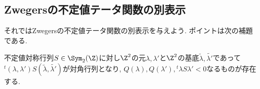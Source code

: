 \documentclass[11pt,b5paper,oneside,lualatex]{ltjsarticle} %
\numberwithin{equation}{section} %
\begin{document}

\subsection{Zwegersの不定値テータ関数の別表示} \label{subsec:Zwegers_theta_rep}


それではZwegersの不定値テータ関数の別表示を与えよう. 
ポイントは次の補題である. 

\begin{lem} \label{lembasis_indef}
	不定値対称行列$ S \in \Sym_2(\Z) $に対し$ \Z^2 $の元$ \lambda, \lambda' $と$ \Z^2 $の基底$ \widetilde{\lambda}, \widetilde{\lambda'} $であって
	$ {}^t\!(\lambda, \lambda') S (\widetilde{\lambda}, \widetilde{\lambda'}) $が対角行列となり, 
	$ Q(\lambda), Q(\lambda'), {}^t\!\lambda S \lambda' < 0 $なるものが存在する. 
\end{lem}
\end{document}
